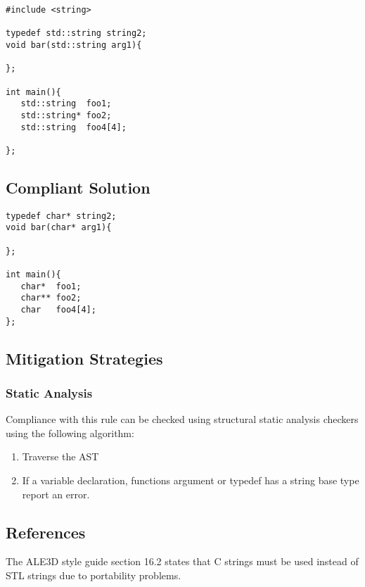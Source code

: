 
\begin{verbatim}
#include <string>

typedef std::string string2;
void bar(std::string arg1){

};

int main(){
   std::string  foo1;
   std::string* foo2;
   std::string  foo4[4];

};
\end{verbatim}

\subsection{Compliant Solution}


\begin{verbatim}
typedef char* string2;
void bar(char* arg1){

};

int main(){
   char*  foo1;
   char** foo2;
   char   foo4[4];
};
\end{verbatim}

\subsection{Mitigation Strategies}
\subsubsection{Static Analysis} 

Compliance with this rule can be checked using structural static analysis checkers using the following algorithm:

\begin{enumerate}
\item Traverse the AST
\item If a variable declaration, functions argument or typedef has a string base type report an error.
\end{enumerate}

\subsection{References}
The ALE3D style guide section 16.2 states that C strings must
be used instead of STL strings due to portability problems. 

